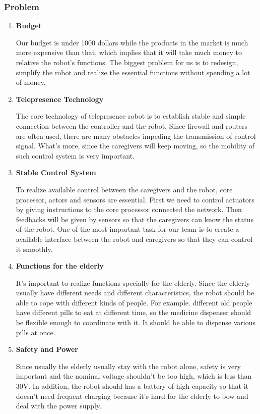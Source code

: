 \documentclass[12pt]{article}
\newcommand{\gadd}[1]{{\color{gray} #1}}
\begin{document}
\gadd{
\subsubsection{Problem}
\begin{enumerate}[1]
\item \textbf{Budget}
\par Our budget is under 1000 dollars while the products in the market is much more expensive than that, which implies that it will take much money to relative the robot's functions. The biggest problem for us is to redesign, simplify the robot and realize the essential functions without spending a lot of money.
\item \textbf{Telepresence Technology}
\par The core technology of telepresence robot is to establish stable and simple connection between the controller and the robot. Since firewall and routers are often used, there are many obstacles impeding the transmission of control signal. What's more, since the caregivers will keep moving, so the mobility of such control system is very important.
\item \textbf{Stable Control System} 
\par To realize available control between the caregivers and the robot, core processor, actors and sensors are essential. First we need to control actuators by giving instructions to the core processor connected the network. Then feedbacks will be given by sensors so that the caregivers can know the status of the robot. One of the most important task for our team is to create a available interface between the robot and caregivers so that they can control it smoothly.
\item \textbf{Functions for the elderly}
\par It's important to realize functions specially for the elderly. Since the elderly usually have different needs and different characteristics, the robot should be able to cope with different kinds of people. For example. different old people have different pills to eat at different time, so the medicine dispenser should be flexible enough to coordinate with it. It should be able to dispense various pills at once.
\item \textbf{Safety and Power}
\par Since usually the elderly usually stay with the robot alone, safety is very important and the nominal voltage shouldn't be too high, which is less than 30V. In addition, the robot should has a battery of high capacity so that it doesn't need frequent charging because it's hard for the elderly to bow and deal with the power supply.
\end{enumerate}}
\end{document}
